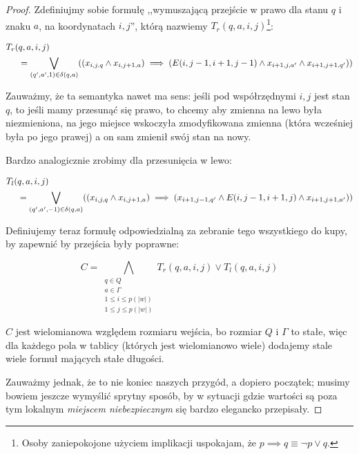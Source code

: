\begin{proof}
	Zdefiniujmy sobie formułę ,,wymuszającą przejście w prawo dla stanu \(q\) i znaku \(a\), na koordynatach \(i, j\)'', którą nazwiemy \(T_r(q, a, i, j)\)\footnote{Osoby zaniepokojone użyciem implikacji uspokajam, że \(p \implies q \equiv \neg p \lor q\).}:

	\[
		\begin{split}
			T_r( & q,a, i, j)                                                                                                                                                            \\
			     & = \bigvee_{(q', a', 1) \in \delta(q,a)} \pars{\pars{x_{i,j,q} \land x_{i, j + 1, a}} \implies \pars{E(i, j-1, i+1, j-1) \land x_{i+1, j, a'} \land x_{i+1, j+1, q'}}}
		\end{split}
	\]

	Zauważmy, że ta semantyka nawet ma sens: jeśli pod współrzędnymi \(i,j\) jest stan \(q\), to jeśli mamy przesunąć się prawo, to chcemy aby zmienna na lewo była niezmieniona, na jego miejsce wskoczyła zmodyfikowana zmienna (która wcześniej była po jego prawej) a on sam zmienił swój stan na nowy.

	Bardzo analogicznie zrobimy dla przesunięcia w lewo:

	\[
		\begin{split}
			T_l( & q, a , i, j)                                                                                                                                                             \\
			     & = \bigvee_{(q', a', -1) \in \delta(q,a)} \pars{\pars{x_{i,j,q} \land x_{i, j + 1, a}} \implies \pars{x_{i+1, j-1, q'} \land E(i, j-1, i+1, j) \land x_{i + 1,j + 1,a'}}}
		\end{split}
	\]


	Definiujemy teraz formułę odpowiedzialną za zebranie tego wszystkiego do kupy, by zapewnić by przejścia były poprawne:

	\[
		C = \bigwedge_{\substack{q \in Q \\ a \in \Gamma \\ 1 \leq i \leq p(|w|) \\ 1 \leq j \leq p(|w|)}} T_r(q,a,i,j) \lor T_l(q,a,i,j)
	\]

	\(C\) jest wielomianowa względem rozmiaru wejścia, bo rozmiar \(Q\) i \(\Gamma\) to stałe, więc dla każdego pola w tablicy (których jest wielomianowo wiele) dodajemy stale wiele formuł mających stałe długości.

	Zauważmy jednak, że to nie koniec naszych przygód, a dopiero początek; musimy bowiem jeszcze wymyślić sprytny sposób, by w sytuacji gdzie wartości są poza tym lokalnym \textit{miejscem niebezpiecznym} się bardzo elegancko przepisały.


\end{proof}

